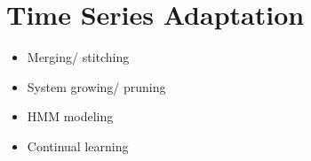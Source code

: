 \documentclass{article}[10 pt]
\begin{document}
\section{Time Series Adaptation}
    \begin{itemize}
        \item Merging/ stitching
        \item System growing/ pruning
        \item HMM modeling 
        \item Continual learning
    \end{itemize}





% 









\end{document}
